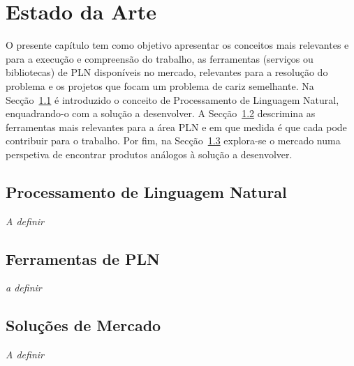 \chapter{Estado da Arte}
\label{chap:Chapter3}

O presente capítulo tem como objetivo apresentar os conceitos mais relevantes e para a execução e compreensão do trabalho, as ferramentas (serviços ou bibliotecas) de \gls{PLN} disponíveis no mercado, relevantes para a resolução do problema e os projetos que focam um problema de cariz semelhante. Na Secção~\ref{sec:chap3_pln} é introduzido o conceito de Processamento de Linguagem Natural, enquadrando-o com a solução a desenvolver. A Secção~\ref{sec:chap3_existingtools} descrimina as ferramentas mais relevantes para a área \gls{PLN} e em que medida é que cada pode contribuir para o trabalho. Por fim, na Secção~\ref{sec:chap3_marketsolutions} explora-se o mercado numa perspetiva de encontrar produtos análogos à solução a desenvolver.

\section{Processamento de Linguagem Natural}
\label{sec:chap3_pln}

\textit{A definir}

\section{Ferramentas de PLN}
\label{sec:chap3_existingtools}

\textit{a definir}

\section{Soluções de Mercado}
\label{sec:chap3_marketsolutions}

\textit{A definir}

